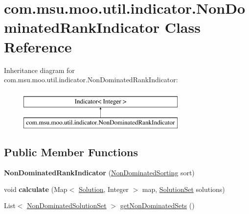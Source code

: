 \hypertarget{classcom_1_1msu_1_1moo_1_1util_1_1indicator_1_1NonDominatedRankIndicator}{\section{com.\-msu.\-moo.\-util.\-indicator.\-Non\-Dominated\-Rank\-Indicator Class Reference}
\label{classcom_1_1msu_1_1moo_1_1util_1_1indicator_1_1NonDominatedRankIndicator}
}
Inheritance diagram for com.\-msu.\-moo.\-util.\-indicator.\-Non\-Dominated\-Rank\-Indicator\-:\begin{figure}[H]
\begin{center}
\leavevmode
\includegraphics[height=2.000000cm]{classcom_1_1msu_1_1moo_1_1util_1_1indicator_1_1NonDominatedRankIndicator}
\end{center}
\end{figure}
\subsection*{Public Member Functions}
\begin{DoxyCompactItemize}
\item 
\hypertarget{classcom_1_1msu_1_1moo_1_1util_1_1indicator_1_1NonDominatedRankIndicator_a04eacae8ef154e5593e09c7555e1fbaf}{{\bfseries Non\-Dominated\-Rank\-Indicator} (\hyperlink{interfacecom_1_1msu_1_1moo_1_1util_1_1sorting_1_1NonDominatedSorting}{Non\-Dominated\-Sorting} sort)}\label{classcom_1_1msu_1_1moo_1_1util_1_1indicator_1_1NonDominatedRankIndicator_a04eacae8ef154e5593e09c7555e1fbaf}

\item 
\hypertarget{classcom_1_1msu_1_1moo_1_1util_1_1indicator_1_1NonDominatedRankIndicator_ac8b518291937a08166a49ddf378f4d25}{void {\bfseries calculate} (Map$<$ \hyperlink{classcom_1_1msu_1_1moo_1_1model_1_1solution_1_1Solution}{Solution}, Integer $>$ map, \hyperlink{classcom_1_1msu_1_1moo_1_1model_1_1solution_1_1SolutionSet}{Solution\-Set} solutions)}\label{classcom_1_1msu_1_1moo_1_1util_1_1indicator_1_1NonDominatedRankIndicator_ac8b518291937a08166a49ddf378f4d25}

\item 
List$<$ \hyperlink{classcom_1_1msu_1_1moo_1_1model_1_1solution_1_1NonDominatedSolutionSet}{Non\-Dominated\-Solution\-Set} $>$ \hyperlink{classcom_1_1msu_1_1moo_1_1util_1_1indicator_1_1NonDominatedRankIndicator_a01b03eefb37e8b671fb00ef0a605d340}{get\-Non\-Dominated\-Sets} ()
\end{DoxyCompactItemize}
